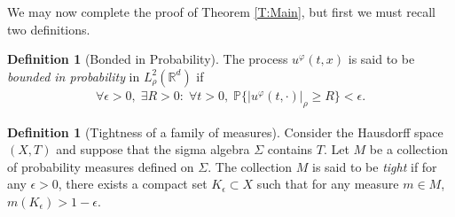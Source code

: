 \documentclass[a4paper,11pt]{article}%
\numberwithin{equation}{section}
\theoremstyle{plain}
\theoremstyle{definition}
\newtheorem{definition}[theorem]{Definition}
\newcommand{\R}{\mathbb{R}}
\begin{document}
We may now complete the proof of Theorem \ref{T:Main}, but first we must recall two definitions.

\begin{definition}[Bonded in Probability]\label{D:bdinprob}
	The process $u^{\varphi}(t,x)$ is said to be \textit{bounded in probability} in $L^2_{\rho}(\R^d)$ if
 	\begin{align}
	 	\forall \epsilon >0, \; \exists R>0: \; \forall t>0, \; \mathbb{P}\{ |u^{\varphi}(t,\cdot)|_{\rho} \ge R \} < \epsilon.
 	\end{align}
\end{definition}

\begin{definition}[Tightness of a family of measures] \label{D:tight}
	Consider the Hausdorff space $(X,T)$ and suppose that the sigma algebra $\Sigma$ contains $T$. Let $M$ be a collection of probability measures defined on $\Sigma$. The collection $M$ is said to be \textit{tight} if for any $\epsilon>0$, there exists a compact set $K_{\epsilon} \subset X$ such that for any measure $m\in M$, $m(K_{\epsilon}) > 1 - \epsilon.$
\end{definition}
\end{document}
